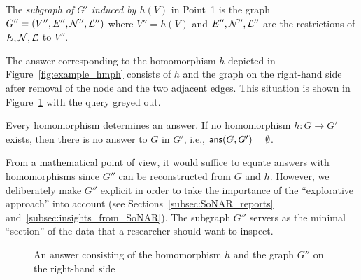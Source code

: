 %
    The \emph{subgraph of $G'$ induced by $h(V)$} in Point~1 is the graph $G'' = (V'', E'', \mathcal{N}'', \mathcal{L}'')$
    where $V'' = h(V)$ and $E'', \mathcal{N}'', \mathcal{L}''$ are the restrictions of $E,\mathcal{N},\mathcal{L}$ to $V''$.
    
    The answer corresponding to the homomorphism $h$ depicted in Figure~\ref{fig:example_hmph}
    consists of $h$ and 
    the graph on the right-hand side after removal of the node  and the two adjacent edges.
    This situation is shown in Figure~\ref{fig:example_answer} with the query greyed out.
    
    Every homomorphism determines an answer. If no homomorphism $h : G \to G'$ exists,
    then there is no answer to $G$ in $G'$, i.e., $\textsf{ans}(G,G') =  \emptyset$.
    
    From a mathematical point of view, it would suffice to equate answers with homomorphisms
    since $G''$ can be reconstructed from $G$ and $h$. However, we deliberately make $G''$ explicit
    in order to take the importance of the \enquote{explorative approach} into account
    (see Sections~\ref{subsec:SoNAR_reports} and~\ref{subsec:insights_from_SoNAR}).
    The subgraph $G''$ servers as the minimal \enquote{section} of the data that a researcher should want to inspect.

\begin{figure}[ht]
  \centering
  \caption{An answer consisting of the homomorphism $h$ and the graph $G''$ on the right-hand side}
  \label{fig:example_answer}
\end{figure}

